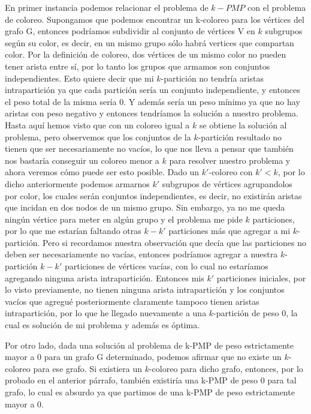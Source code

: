 En primer instancia podemos relacionar el problema de $k-PMP$ con el problema de coloreo. Supongamos que podemos encontrar un k-coloreo para los vértices del grafo G, entonces podríamos subdividir al conjunto de vértices V en $k$ subgrupos según su color, es decir, en un mismo grupo sólo habrá vertices que compartan color. Por la definición de coloreo, dos vértices de un mismo color no pueden tener arista entre sí, por lo tanto los grupos que armamos son conjuntos independientes. Esto quiere decir que mi $k$-partición no tendría aristas intrapartición ya que cada partición sería un conjunto independiente, y entonces el peso total de la misma sería $0$. Y además sería un peso mínimo ya que no hay aristas con peso negativo y entonces tendríamos la solución a nuestro problema. Hasta aquí hemos visto que con un coloreo igual a $k$ se obtiene la solución al problema, pero observemos que los conjuntos de la $k$-partición resultado no tienen que ser necesariamente no vacíos, lo que nos lleva a pensar que también nos bastaría conseguir un coloreo menor a $k$ para resolver nuestro problema y ahora veremos cómo puede ser esto posible. Dado un $k'$-coloreo con $k'<k$, por lo dicho anteriormente podemos armarnos $k'$ subgrupos de vértices agrupandolos por color, los cuales serán conjuntos independientes, es decir, no existirán aristas que incidan en dos nodos de un mismo grupo. Sin embargo, ya no me queda ningún vértice para meter en algún grupo y el problema me pide $k$ particiones, por lo que me estarían faltando otras $k-k'$ particiones más que agregar a mi $k$-partición. Pero si recordamos nuestra observación que decía que las particiones no deben ser necesariamente no vacías, entonces podríamos agregar a nuestra $k$-partición $k-k'$ particiones de vértices vacías, con lo cual no estaríamos agregando ninguna arista intrapartición. Entonces mis $k'$ particiones iniciales, por lo visto previamente, no tienen ninguna arista intrapartición y los conjuntos vacíos que agregué posteriormente claramente tampoco tienen aristas intrapartición, por lo que he llegado nuevamente a una $k$-partición de peso $0$, la cual es solución de mi problema y además es óptima.

Por otro lado, dada una solución al problema de k-PMP de peso estrictamente mayor a $0$ para un grafo G determinado, podemos afirmar que no existe un $k$-coloreo para ese grafo. Si existiera un $k$-coloreo para dicho grafo, entonces, por lo probado en el anterior párrafo, también existiría una k-PMP de peso $0$ para tal grafo, lo cual es absurdo ya que partimos de una k-PMP de peso estrictamente mayor a $0$.

